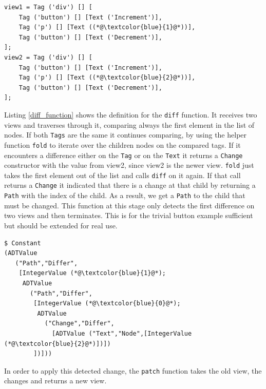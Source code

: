\begin{lstlisting}[columns=fullflexible, label={two_views}, language=JaLi, caption=Two views to compare]
view1 = Tag ('div') [] [
    Tag ('button') [] [Text ('Increment')],
    Tag ('p') [] [Text ((*@\textcolor{blue}{1}@*))],
    Tag ('button') [] [Text ('Decrement')],
];
view2 = Tag ('div') [] [
    Tag ('button') [] [Text ('Increment')],
    Tag ('p') [] [Text ((*@\textcolor{blue}{2}@*))],
    Tag ('button') [] [Text ('Decrement')],
];
\end{lstlisting}

Listing \ref{diff_function} shows the definition for the \texttt{diff} function. It receives two views and traverses through it, comparing always the first element in the list of nodes. If both \texttt{Tags} are the same it continues comparing, by using the helper function \texttt{fold} to iterate over the children nodes on the compared tags.
If it encounters a difference either on the \texttt{Tag} or on the \texttt{Text} it returns a \texttt{Change} constructor with the value from view2, since view2 is the newer view.
\texttt{fold} just takes the first element out of the list and calls \texttt{diff} on it again. If that call returns a \texttt{Change} it indicated that there is a change at that child by returning a \texttt{Path} with the index of the child. As a result, we get a \texttt{Path} to the child that must be changed. 
This function at this stage only detects the first difference on two views and then terminates. This is for the trivial button example sufficient but should be extended for real use.

\begin{lstlisting}[columns=fullflexible, label={non-reduced-differ}, language=Other, caption=Differ path detecting change on \texttt{Text} node]
$ Constant
(ADTValue
   ("Path","Differ",
    [IntegerValue (*@\textcolor{blue}{1}@*);
     ADTValue
       ("Path","Differ",
        [IntegerValue (*@\textcolor{blue}{0}@*);
         ADTValue
           ("Change","Differ",
             [ADTValue ("Text","Node",[IntegerValue (*@\textcolor{blue}{2}@*)])])
        ])]))
\end{lstlisting}



In order to apply this detected change, the \texttt{patch} function takes the old view, the changes and returns a new view.

